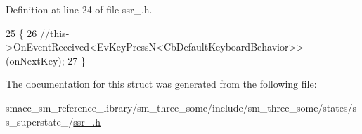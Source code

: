 Definition at line 24 of file ssr\+\_.\+h.


\begin{DoxyCode}
25   \{
26     \textcolor{comment}{//this->OnEventReceived<EvKeyPressN<CbDefaultKeyboardBehavior>>(onNextKey);}
27   \}
\end{DoxyCode}


The documentation for this struct was generated from the following file\+:\begin{DoxyCompactItemize}
\item 
smacc\+\_\+sm\+\_\+reference\+\_\+library/sm\+\_\+three\+\_\+some/include/sm\+\_\+three\+\_\+some/states/ss\+\_\+superstate\+\_/\hyperlink{ssr__3_8h}{ssr\+\_.\+h}\end{DoxyCompactItemize}
